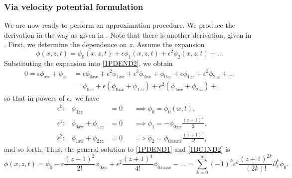 \documentclass[10pt,reqno,oneside,a4paper]{article}
\begin{document}
\subsubsection{Via velocity potential formulation}
We are now ready to perform an approximation procedure. We produce the derivation in the way as given in \cite[Chapter 4]{bernard}. Note that there is another derivation, given in \cite[Chapter 5]{ablowitz}. First, we determine the dependence on $z.$ Assume the expansion 
\[
\phi(x,z,t) = \phi_0(x,z,t) + \epsilon \phi_1(x,z,t) + \epsilon^2 \phi_2(x,z,t) + \ldots
\]
Substituting the expansion into \eqref{1PDEND2}, we obtain
\begin{align*}
0 = \epsilon\phi_{xx} + \phi_{zz} &= \epsilon\phi_{0xx} + \epsilon^2 \phi_{1xx}+ \epsilon^3 \phi_{2xx} + \phi_{0zz} + \epsilon \phi_{1zz}+ \epsilon^2 \phi_{2zz} + \ldots \\
&= \phi_{0zz} + \epsilon(\phi_{0xx} + \phi_{1zz}) + \epsilon^2(\phi_{1xx}+\phi_{2zz}) + \ldots
\end{align*}
so that in powers of $\epsilon,$ we have
\begin{align*}
&\epsilon^0: &\phi_{0zz} &= 0 &&\implies \phi_0 = \phi_0(x,t), \\
&\epsilon^1: &\phi_{0xx} + \phi_{1zz} &= 0 &&\implies \phi_1 = - \phi_{0xx} \frac{(z+1)^2}{2},\\
&\epsilon^2: &\phi_{1xx}+\phi_{2zz} &= 0 &&\implies \phi_2 = \phi_{0xxxx} \frac{(z+1)^4}{4!},
\end{align*}
and so forth. Thus, the general solution to \eqref{1PDEND1} and \eqref{1BC1ND2} is 
\begin{equation}\label{ExpansionPhi}
\phi(x,z,t) = \phi_0 - \epsilon\frac{(z+1)^2}{2!}\phi_{0xx} + \epsilon^2 \frac{(z+1)^4}{4!}\phi_{0xxxx} - \ldots = \sum^{\infty}_{k=0} (-1)^k \epsilon^k \frac{(z+1)^{2k}}{(2k)!} \partial^k_x \phi_0.
\end{equation}
\end{document}
